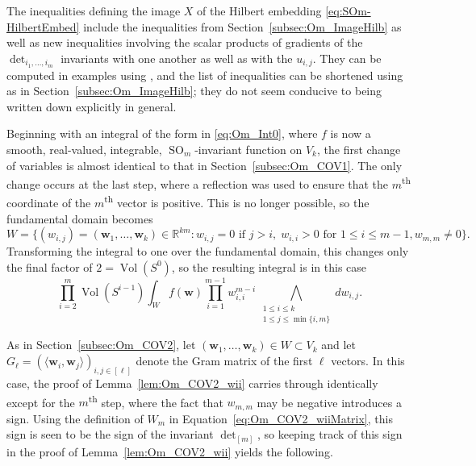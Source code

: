 \documentclass[twoside]{amsart}
\theoremstyle{definition}
\theoremstyle{remark}
\numberwithin{equation}{section}
\newcommand{\R}{\mathbb{R}}
\newcommand{\SO}{\operatorname{SO}}
\newcommand{\Vol}{\operatorname{Vol}}
\begin{document}
The inequalities defining the image $X$ of the Hilbert embedding \eqref{eq:SOm-HilbertEmbed} include the inequalities from Section~\ref{subsec:Om_ImageHilb}
as well as new inequalities involving the scalar products of gradients of the $\det\nolimits_{i_1,\ldots,i_m}$ invariants with one another as well as with the $u_{i,j}$.
They can be computed in examples using \cite[Thrm~0.10 and Prop.~0.6]{ProcesiSchwarz}, and the list of inequalities can be shortened using
\cite[Cor.~7.2.4]{HornJohnsonMatrixAnBook} as in Section~\ref{subsec:Om_ImageHilb}; they do not seem conducive to being written down explicitly in general.

Beginning with an integral of the form in \eqref{eq:Om_Int0}, where $f$ is now a smooth, real-valued, integrable, $\SO_m$-invariant function on $V_k$,
the first change of variables is almost identical to that in Section~\ref{subsec:Om_COV1}. The only change occurs at the last step, where a reflection
was used to ensure that the $m$\textsuperscript{th} coordinate of the $m$\textsuperscript{th} vector is positive. This is no longer possible, so the fundamental
domain becomes
\begin{equation}
\label{eq:SOm_FundDomain}
    W   =   \big\{(w_{i,j}) = (\mathbf{w}_1,\ldots,\mathbf{w}_k)\in\R^{km} :
                w_{i,j} = 0 \text{ if } j > i, \;
                w_{i,i} > 0 \text{ for } 1\leq i\leq m - 1, w_{m,m}\neq 0 \big\}.
\end{equation}
Transforming the integral to one over the fundamental domain, this changes only the final factor of $2 = \Vol(S^0)$, so the resulting integral is in this case
\begin{equation}
\label{eq:SOm_Int1}
    \prod\limits_{i=2}^m \Vol(S^{i-1}) \int_{W}  f(\mathbf{w})
        \prod\limits_{i=1}^{m-1} w_{i,i}^{m-i} \,
        \bigwedge\limits_{\substack{1\leq i\leq k \\ 1\leq j \leq {\min\{i,m\}} }}  dw_{i,j}.
\end{equation}

As in Section~\ref{subsec:Om_COV2}, let $(\mathbf{w}_1,\ldots,\mathbf{w}_k)\in W\subset V_k$ and let
$G_\ell = (\langle \mathbf{w}_i, \mathbf{w}_j\rangle)_{i,j\in[\ell]}$ denote the Gram matrix of the first $\ell$ vectors.
In this case, the proof of Lemma~\ref{lem:Om_COV2_wii} carries through identically except for the $m$\textsuperscript{th} step,
where the fact that $w_{m,m}$ may be negative introduces a sign. Using the definition of $W_m$ in Equation~\eqref{eq:Om_COV2_wiiMatrix},
this sign is seen to be the sign of the invariant $\det\nolimits_{[m]}$, so keeping track of this sign in the proof of
Lemma~\ref{lem:Om_COV2_wii} yields the following.
\end{document}
